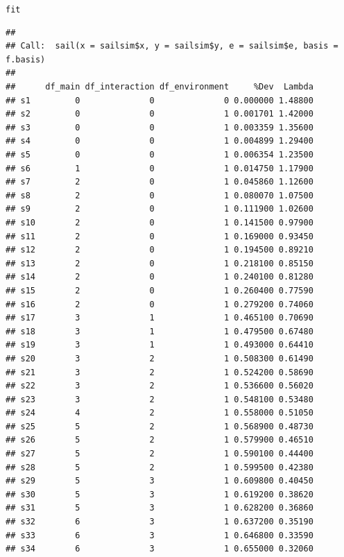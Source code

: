 \documentclass[12pt,letter]{article}\usepackage[]{graphicx}\usepackage[]{color}
\makeatletter
\newcommand{\hlstd}[1]{\textcolor[rgb]{0.345,0.345,0.345}{#1}}%
\newenvironment{kframe}{%
 \def\at@end@of@kframe{}%
 \ifinner\ifhmode%
  \def\at@end@of@kframe{\end{minipage}}%
  \begin{minipage}{\columnwidth}%
 \fi\fi%
 \def\FrameCommand##1{\hskip\@totalleftmargin \hskip-\fboxsep
 \colorbox{shadecolor}{##1}\hskip-\fboxsep
     \hskip-\linewidth \hskip-\@totalleftmargin \hskip\columnwidth}%
 \MakeFramed {\advance\hsize-\width
   \@totalleftmargin\z@ \linewidth\hsize
   \@setminipage}}%
 {\par\unskip\endMakeFramed%
 \at@end@of@kframe}
\newenvironment{knitrout}{}{} %
\makeatother
\begin{document}
\begin{knitrout}\scriptsize
{}\color{fgcolor}\begin{kframe}
\begin{alltt}
\hlstd{fit}
\end{alltt}
\begin{verbatim}
## 
## Call:  sail(x = sailsim$x, y = sailsim$y, e = sailsim$e, basis = f.basis) 
## 
##      df_main df_interaction df_environment     %Dev  Lambda
## s1         0              0              0 0.000000 1.48800
## s2         0              0              1 0.001701 1.42000
## s3         0              0              1 0.003359 1.35600
## s4         0              0              1 0.004899 1.29400
## s5         0              0              1 0.006354 1.23500
## s6         1              0              1 0.014750 1.17900
## s7         2              0              1 0.045860 1.12600
## s8         2              0              1 0.080070 1.07500
## s9         2              0              1 0.111900 1.02600
## s10        2              0              1 0.141500 0.97900
## s11        2              0              1 0.169000 0.93450
## s12        2              0              1 0.194500 0.89210
## s13        2              0              1 0.218100 0.85150
## s14        2              0              1 0.240100 0.81280
## s15        2              0              1 0.260400 0.77590
## s16        2              0              1 0.279200 0.74060
## s17        3              1              1 0.465100 0.70690
## s18        3              1              1 0.479500 0.67480
## s19        3              1              1 0.493000 0.64410
## s20        3              2              1 0.508300 0.61490
## s21        3              2              1 0.524200 0.58690
## s22        3              2              1 0.536600 0.56020
## s23        3              2              1 0.548100 0.53480
## s24        4              2              1 0.558000 0.51050
## s25        5              2              1 0.568900 0.48730
## s26        5              2              1 0.579900 0.46510
## s27        5              2              1 0.590100 0.44400
## s28        5              2              1 0.599500 0.42380
## s29        5              3              1 0.609800 0.40450
## s30        5              3              1 0.619200 0.38620
## s31        5              3              1 0.628200 0.36860
## s32        6              3              1 0.637200 0.35190
## s33        6              3              1 0.646800 0.33590
## s34        6              3              1 0.655000 0.32060

\end{verbatim}
\end{kframe}
\end{knitrout}
\end{document}
